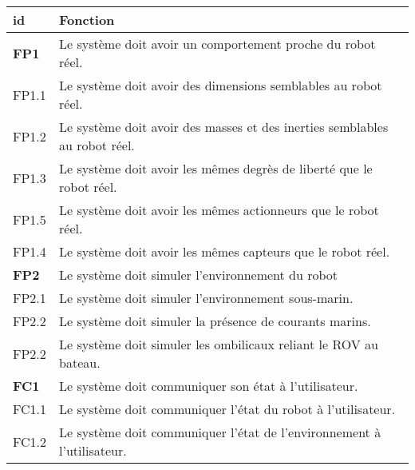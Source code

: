         \begin{table}[!htb]
            \centering
            \begin{adjustbox}{max width=\textwidth}
                \begin{tabularx}{\textwidth}{|lX|}
                    \hline
                    \cellcolor{gray!25}\textbf{id} & \cellcolor{gray!25} \textbf{Fonction} \\
                    \hline \hline
                    \cellcolor{blue!30}\textbf{FP1}&\cellcolor{blue!25} Le système doit avoir un comportement proche du robot réel. \\
                    \hline
                    \cellcolor{gray!10}FP1.1& Le système doit avoir des dimensions semblables au robot réel. \\
                    \hline
                    \cellcolor{gray!10}FP1.2& Le système doit avoir des masses et des inerties semblables au robot réel. \\
                    \hline
                    \cellcolor{gray!10}FP1.3& Le système doit avoir les mêmes degrès de liberté que le robot réel. \\
                    \hline
                    \cellcolor{gray!10}FP1.5& Le système doit avoir les mêmes actionneurs que le robot réel. \\
                    \hline
                    \cellcolor{gray!10}FP1.4& Le système doit avoir les mêmes capteurs que le robot réel. \\
            
                    \hline \hline
            
                    \cellcolor{blue!30}\textbf{FP2}&\cellcolor{blue!25} Le système doit simuler l'environnement du robot \\
                    \hline
                    \cellcolor{gray!10}FP2.1& Le système doit simuler l'environnement sous-marin. \\
                    \hline
                    \cellcolor{gray!10}FP2.2& Le système doit simuler la présence de courants marins. \\
                    \hline
                    \cellcolor{gray!10}FP2.2& Le système doit simuler les ombilicaux reliant le \gls{ROV} au bateau. \\
                    \hline
            
                    \hline \hline
            
                    \cellcolor{orange!40}\textbf{FC1} &\cellcolor{orange!30} Le système doit communiquer son état à l'utilisateur. \\
                    \hline
                    \cellcolor{gray!10}FC1.1& Le système doit communiquer l'état du robot à l'utilisateur. \\
                    \hline
                    \cellcolor{gray!10}FC1.2& Le système doit communiquer l'état de l'environnement à l'utilisateur.\\
                    \hline
            

\end{tabularx}
\end{adjustbox}
\end{table}
